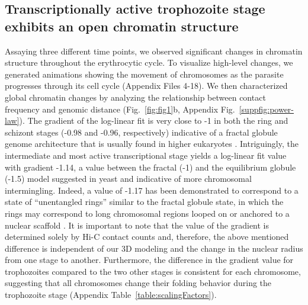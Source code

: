 \subsection{Transcriptionally active trophozoite stage exhibits an open chromatin structure}

Assaying three different time points, we observed significant changes in
chromatin structure throughout the erythrocytic cycle. To visualize high-level
changes, we generated animations showing the movement of chromosomes as the
parasite progresses through its cell cycle (Appendix Files 4-18). We then
characterized global chromatin changes by analyzing the relationship between
contact frequency and genomic distance (Fig.~\ref{fig:fig1}b, Appendix
Fig.~\ref{suppfig:power-law}). The gradient of the log-linear fit is very
close to -1 in both the ring and schizont stages (-0.98 and -0.96,
respectively) indicative of a fractal globule genome architecture that is
usually found in higher eukaryotes \citep{lieberman-aiden:comprehensive}.
Intriguingly, the intermediate and most active transcriptional stage yields a
log-linear fit value with gradient -1.14, a value between the fractal (-1) and
the equilibrium globule (-1.5) model suggested in yeast
\citep{fudenberg:higher-order} and indicative of more chromosomal
intermingling. Indeed, a value of -1.17 has been demonstrated to correspond to
a state of ``unentangled rings'' similar to the fractal globule state, in
which the rings may correspond to long chromosomal regions looped on or
anchored to a nuclear scaffold \citep{vettorel:statistics}. It is important to
note that the value of the gradient is determined solely by Hi-C contact
counts and,  therefore, the above mentioned difference is independent of our
3D modeling and the change in the nuclear radius from one stage to another.
Furthermore, the difference in the gradient value for trophozoites compared to
the two other stages is consistent for each chromosome, suggesting that all
chromosomes change their folding behavior during the trophozoite stage
(Appendix Table~\ref{table:scalingFactors}).


